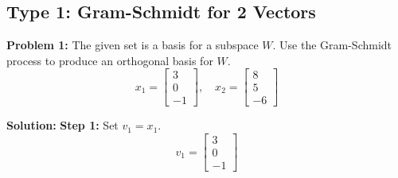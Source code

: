 \documentclass[11pt, letterpaper]{article}
\theoremstyle{definition}
\theoremstyle{remark}
\begin{document}
\subsection{Type 1: Gram-Schmidt for 2 Vectors}

\textbf{Problem 1:} 
The given set is a basis for a subspace $W$. Use the Gram-Schmidt process to produce an orthogonal basis for $W$.
\[ x_1 = \begin{bmatrix} 3 \\ 0 \\ -1 \end{bmatrix}, \quad x_2 = \begin{bmatrix} 8 \\ 5 \\ -6 \end{bmatrix} \]

\textbf{Solution:}
\textbf{Step 1:} Set $v_1 = x_1$.
\[ v_1 = \begin{bmatrix} 3 \\ 0 \\ -1 \end{bmatrix} \]
\end{document}
